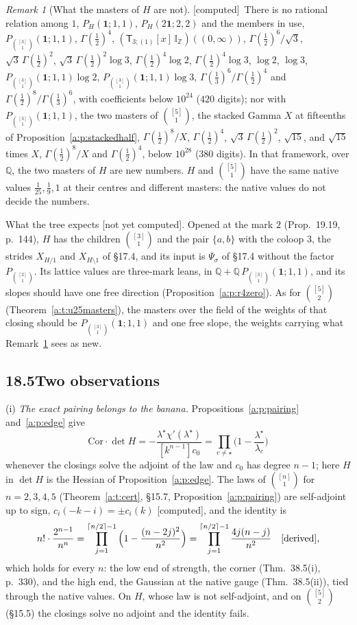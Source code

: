 \documentclass[11pt]{article}
\newcommand{\one}{\mathbf 1}
\newcommand{\sT}{\mathsf T}
\newcommand{\IZ}{\mathbb I_{\mathbb Z}}
\newcommand{\Tx}[3]{(\sT_{#1;(1)}[x]\,#2)((#3,\infty))}
\newcommand{\Pth}{P_{\binom{[3]}1}(\one;1,1)}
\theoremstyle{plain}
\theoremstyle{definition}
\theoremstyle{remark}
\newtheorem{remark}[proposition]{Remark}
\newcommand{\derived}{\textup{[derived]}}
\newcommand{\computed}{\textup{[computed]}}
\newcommand{\notyet}{\textup{[not yet computed]}}
\begin{document}
\begin{remark}[What the masters of $H$ are not]\label{a:r:Hnot}\computed\
There is no rational relation among $1$, $P_H(\one;1,1)$, $P_H(2\one;2,2)$ and the members in use, $\Pth$, $\Gamma(\frac12)^4$, $\Tx{3}{\IZ}{0}$, $\Gamma(\frac12)^6/\sqrt3$, $\sqrt3\,\Gamma(\frac12)^2$, $\sqrt3\,\Gamma(\frac12)^2\log3$, $\Gamma(\frac12)^4\log2$, $\Gamma(\frac12)^4\log3$, $\log2$, $\log3$, $\Pth\log2$, $\Pth\log3$, $\Gamma(\frac13)^6/\Gamma(\frac12)^4$ and $\Gamma(\frac12)^8/\Gamma(\frac13)^6$, with coefficients below $10^{24}$ ($420$ digits); nor with $\Pth$, the two masters of $\binom{[5]}1$, the stacked Gamma $X$ at fifteenths of Proposition~\ref{a:p:stackedhalf}, $\Gamma(\frac12)^8/X$, $\Gamma(\frac12)^4$, $\sqrt3\,\Gamma(\frac12)^2$, $\sqrt{15}$, and $\sqrt{15}$ times $X$, $\Gamma(\frac12)^8/X$ and $\Gamma(\frac12)^4$, below $10^{28}$ ($380$ digits). In that framework, over $\mathbb Q$, the two masters of $H$ are new numbers. $H$ and $\binom{[5]}1$ have the same native values $\frac1{25},\frac19,1$ at their centres and different masters: the native values do not decide the numbers.
\end{remark}

\noindent What the tree expects \notyet. Opened at the mark $2$ (Prop.~19.19, p.~144), $H$ has the children $\binom{[3]}1$ and the pair $\{a,b\}$ with the coloop $3$, the strides $X_{H/1}$ and $X_{H\setminus1}$ of \S17.4, and its input is $\Psi_\sigma$ of \S17.4 without the factor $P_{\binom{[2]}1}$. Its lattice values are three-mark leans, in $\mathbb Q+\mathbb Q\,\Pth$, and its slopes should have one free direction (Proposition~\ref{a:p:r4zero}). As for $\binom{[5]}2$ (Theorem~\ref{a:t:u25masters}), the masters over the field of the weights of that closing should be $\Pth$ and one free slope, the weights carrying what Remark~\ref{a:r:Hnot} sees as new.

\subsection*{18.5\quad Two observations}

(i) \emph{The exact pairing belongs to the banana.} Propositions~\ref{a:p:pairing} and~\ref{a:p:edge} give
\[
\mathrm{Cor}\cdot\det H=-\frac{\lambda^\star\chi'(\lambda^\star)}{[k^{n-1}]c_0}=\prod_{c\ne\star}\Big(1-\frac{\lambda^\star}{\lambda_c}\Big)
\]
whenever the closings solve the adjoint of the law and $c_0$ has degree $n-1$; here $H$ in $\det H$ is the Hessian of Proposition~\ref{a:p:edge}. The laws of $\binom{[n]}1$ for $n=2,3,4,5$ (Theorem~\ref{a:t:cert}, \S15.7, Proposition~\ref{a:p:pairing}) are self-adjoint up to sign, $c_i(-k-i)=\pm c_i(k)$ \computed, and the identity is
\[
n!\cdot\frac{2^{n-1}}{n^n}=\prod_{j=1}^{\lceil n/2\rceil-1}\Big(1-\frac{(n-2j)^2}{n^2}\Big)=\prod_{j=1}^{\lceil n/2\rceil-1}\frac{4j(n-j)}{n^2}\quad\derived,
\]
which holds for every $n$: the low end of strength, the corner (Thm.~38.5(i), p.~330), and the high end, the Gaussian at the native gauge (Thm.~38.5(ii)), tied through the native values. On $H$, whose law is not self-adjoint, and on $\binom{[5]}2$ (\S15.5) the closings solve no adjoint and the identity fails.
\end{document}
